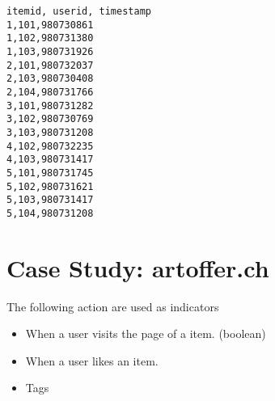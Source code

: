 \documentclass[twoside,a4paper]{article}
\begin{document}
\begin{verbatim}
itemid, userid, timestamp
1,101,980730861
1,102,980731380
1,103,980731926
2,101,980732037
2,103,980730408
2,104,980731766
3,101,980731282
3,102,980730769
3,103,980731208
4,102,980732235
4,103,980731417
5,101,980731745
5,102,980731621
5,103,980731417
5,104,980731208
\end{verbatim}


\section{Case Study: artoffer.ch}
\label{sec:artoffer}

The following action are used as indicators
\begin{itemize}
\item When a user visits the page of a item. (boolean)
\item When a user likes an item.
\item Tags
\end{itemize}


\end{document}
